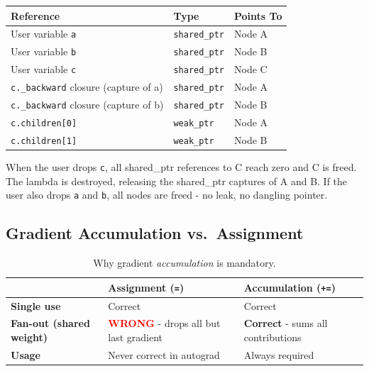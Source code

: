\documentclass[12pt, a4paper]{article}
\begin{document}
\begin{center}
\renewcommand{\arraystretch}{1.4}
\begin{tabular}{@{} l l l @{}}
\toprule
\textbf{Reference} & \textbf{Type} & \textbf{Points To} \\
\midrule
User variable \texttt{a}                      & \texttt{shared\_ptr} & Node A \\
User variable \texttt{b}                      & \texttt{shared\_ptr} & Node B \\
User variable \texttt{c}                      & \texttt{shared\_ptr} & Node C \\
\texttt{c.\_backward} closure (capture of a) & \texttt{shared\_ptr} & Node A \\
\texttt{c.\_backward} closure (capture of b) & \texttt{shared\_ptr} & Node B \\
\texttt{c.children[0]}                        & \texttt{weak\_ptr}   & Node A \\
\texttt{c.children[1]}                        & \texttt{weak\_ptr}   & Node B \\
\bottomrule
\end{tabular}
\end{center}

\vspace{0.5em}
When the user drops \texttt{c}, all shared\_ptr references to C reach zero
and C is freed.  The lambda is destroyed, releasing the shared\_ptr captures of
A and B.  If the user also drops \texttt{a} and \texttt{b}, all nodes are freed
- no leak, no dangling pointer.

\subsection{Gradient Accumulation vs.\ Assignment}

\begin{table}[!ht]
\centering
\renewcommand{\arraystretch}{1.35}
\begin{tabularx}{\textwidth}{@{} l L L @{}}
\toprule
& \textbf{Assignment (\texttt{=})} & \textbf{Accumulation (\texttt{+=})} \\
\midrule
\textbf{Single use} & Correct & Correct \\
\textbf{Fan-out (shared weight)} & \textcolor{red}{\textbf{WRONG}} - drops all but last gradient & \textcolor{green!60!black}{\textbf{Correct}} - sums all contributions \\
\textbf{Usage} & Never correct in autograd & Always required \\
\bottomrule
\end{tabularx}
\caption{Why gradient \emph{accumulation} is mandatory.}
\end{table}
\end{document}
